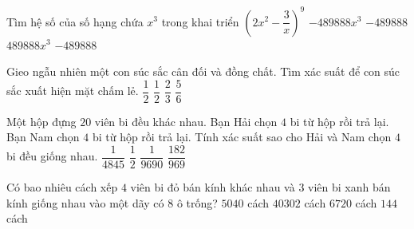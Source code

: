 \begin{ex}%
		Tìm hệ số của số hạng chứa $x^3$ trong khai triển ${\left(2x^2-\dfrac{3}{x}\right)}^9$
		\choice
		{$-489888x^3$}
		{\True $-489888$}
		{$489888x^3$}
		{$-489888$}
	\end{ex}

\begin{ex}%
	Gieo ngẫu nhiên một con súc sắc cân đối và đồng chất. Tìm xác suất để con súc sắc xuất hiện mặt chấm lẻ.
	\choice
	{\True $\dfrac{1}{2}$}
	{$\dfrac{1}{2}$}
	{$\dfrac{2}{3}$}
	{$\dfrac{5}{6}$}
\end{ex}

\begin{ex}%
	Một hộp đựng $ 20 $ viên bi đều khác nhau. Bạn Hải chọn $ 4 $ bi từ hộp rồi trả lại. Bạn Nam chọn $4$ bi từ hộp rồi trả lại. Tính xác suất sao cho Hải và Nam chọn $ 4 $ bi đều giống nhau.
	\choice
	{\True$\dfrac{1}{4845}$}
	{$\dfrac{1}{2}$}
	{$\dfrac{1}{9690}$}
	{$\dfrac{182}{969}$}
\end{ex}

\begin{ex}%
			Có bao nhiêu cách xếp $ 4 $ viên bi đỏ bán kính khác nhau và $ 3 $ viên bi xanh bán kính giống nhau vào một dãy có $ 8 $ ô trống?
			\choice
			{$5040$ cách}
			{$40302$ cách}
			{\True$6720$ cách}
			{$144$ cách}
		\end{ex}

